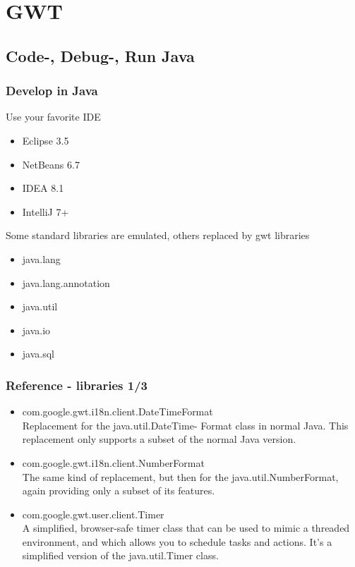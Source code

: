 \section{GWT}

\subsection{Code-, Debug-, Run Java}

\begin{frame}[red] %
\frametitle{Develop in Java}

Use your favorite IDE
\begin{itemize}
	\item Eclipse 3.5
	\item NetBeans 6.7
	\item IDEA 8.1
	\item IntelliJ 7+
\end {itemize}

Some standard libraries are emulated, others replaced by gwt libraries
\begin{itemize}
\item java.lang
\item java.lang.annotation
\item java.util
\item java.io
\item java.sql

\end{itemize}


\end{frame}

\begin{frame}
\frametitle{Reference - libraries 1/3}

\begin{itemize}
\item com.google.gwt.i18n.client.DateTimeFormat\\Replacement for the java.util.DateTime-
Format class in normal Java. This replacement only supports a subset of the
normal Java version.
\item com.google.gwt.i18n.client.NumberFormat\\The same kind of replacement, but then
for the java.util.NumberFormat, again providing only a subset of its features.
\item com.google.gwt.user.client.Timer\\A simplified, browser-safe timer class that can be
used to mimic a threaded environment, and which allows you to schedule tasks and
actions. It’s a simplified version of the java.util.Timer class.
\end{itemize}

\end{frame}


